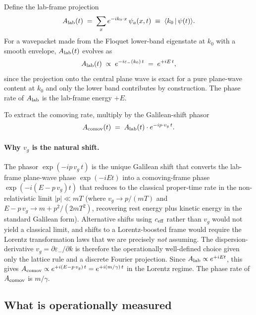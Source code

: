 \documentclass[11pt,a4paper]{article}
\begin{document}
Define the lab-frame projection
\begin{equation}
A_{\rm lab}(t) \;=\; \sum_x e^{-i k_0 \cdot x}\, \psi_a(x, t)
\;\equiv\; \langle k_0 \,|\, \psi(t) \rangle.
\label{eq:Alab}
\end{equation}
For a wavepacket made from the Floquet lower-band eigenstate at
$k_0$ with a smooth envelope, $A_{\rm lab}(t)$ evolves as
\begin{equation}
A_{\rm lab}(t) \;\propto\; e^{-i \varepsilon_-(k_0)\, t}
\;=\; e^{+i E\, t},
\label{eq:Alab_evol}
\end{equation}
since the projection onto the central plane wave is exact for a
pure plane-wave content at $k_0$ and only the lower band
contributes by construction. The phase rate of $A_{\rm lab}$ is
the lab-frame energy $+E$.

To extract the comoving rate, multiply by the Galilean-shift
phasor
\begin{equation}
A_{\rm comov}(t) \;=\; A_{\rm lab}(t)
\cdot e^{-i p \cdot v_g\, t}.
\label{eq:Acomov}
\end{equation}

\paragraph{Why $v_g$ is the natural shift.}
The phasor $\exp(-i p\,v_g\,t)$ is the unique Galilean shift
that converts the lab-frame plane-wave phase $\exp(-i E t)$
into a comoving-frame phase $\exp(-i(E - p\,v_g)t)$ that
reduces to the classical proper-time rate in the
non-relativistic limit $|p| \ll mT$ (where $v_g \to p/(mT)$ and
$E - p\,v_g \to m + p^2/(2mT^2)$, recovering rest energy plus
kinetic energy in the standard Galilean form). Alternative
shifts using $c_{\rm eff}$ rather than $v_g$ would not yield a
classical limit, and shifts to a Lorentz-boosted frame would
require the Lorentz transformation laws that we are precisely
\emph{not} assuming. The dispersion-derivative
$v_g = \partial \varepsilon_-/\partial k$ is therefore the
operationally well-defined choice given only the lattice rule
and a discrete Fourier projection.
Since $A_{\rm lab} \propto e^{+iE t}$, this gives
$A_{\rm comov} \propto e^{+i(E - p\,v_g)\,t} = e^{+i (m/\gamma)\, t}$
in the Lorentz regime. The phase rate of $A_{\rm comov}$ is
$m/\gamma$.

\subsection{What is operationally measured}
\end{document}
